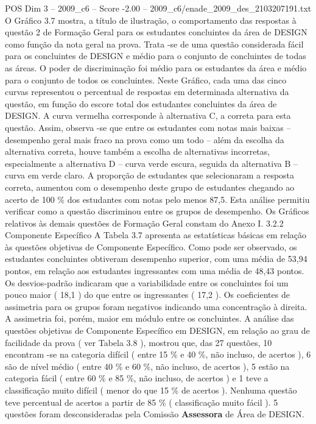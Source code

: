 \begin{textsample}{POS Dim 3 – 2009\_c6 – Score -2.00 – 2009\_c6/enade\_2009\_des\_2103207191.txt}
O Gráfico 3.7 mostra, a título de ilustração, o comportamento das respostas à questão 2 de Formação Geral para os estudantes concluintes da área de DESIGN como função da nota geral na prova.
Trata -se de uma questão considerada fácil para os concluintes de DESIGN e médio para o conjunto de concluintes de todas as áreas.
O poder de discriminação foi médio para os estudantes da área e médio para o conjunto de todos os concluintes.
Neste Gráfico, cada uma das cinco curvas representou o percentual de respostas em determinada alternativa da questão, em função do escore total dos estudantes concluintes da área de DESIGN.
A curva vermelha corresponde à alternativa C, a correta para esta questão.
Assim, observa -se que entre os estudantes com notas mais baixas – desempenho geral mais fraco na prova como um todo – além da escolha da alternativa correta, houve também a escolha de alternativas incorretas, especialmente a alternativa D – curva verde escura, seguida da alternativa B – curva em verde claro.
A proporção de estudantes que selecionaram a resposta correta, aumentou com o desempenho deste grupo de estudantes chegando ao acerto de 100 \% dos estudantes com notas pelo menos 87,5.
Esta análise permitiu verificar como a questão discriminou entre os grupos de desempenho.
Os Gráficos relativos às demais questões de Formação Geral constam do Anexo I. 3.2.2 Componente Específico A Tabela 3.7 apresenta as estatísticas básicas em relação às questões objetivas de Componente Específico.
Como pode ser observado, os estudantes concluintes obtiveram desempenho superior, com uma média de 53,94 pontos, em relação aos estudantes ingressantes com uma média de 48,43 pontos.
Os desvios-padrão indicaram que a variabilidade entre os concluintes foi um pouco maior ( 18,1 ) do que entre os ingressantes ( 17,2 ).
Os coeficientes de assimetria para os grupos foram negativos indicando uma concentração à direita.
A assimetria foi, porém, maior em módulo entre os concluintes.
A análise das questões objetivas de Componente Específico em DESIGN, em relação ao grau de facilidade da prova ( ver Tabela 3.8 ), mostrou que, das 27 questões, 10 encontram -se na categoria difícil ( entre 15 \% e 40 \%, não incluso, de acertos ), 6 são de nível médio ( entre 40 \% e 60 \%, não incluso, de acertos ), 5 estão na categoria fácil ( entre 60 \% e 85 \%, não incluso, de acertos ) e 1 teve a classificação muito difícil ( menor do que 15 \% de acertos ).
Nenhuma questão teve percentual de acertos a partir de 85 \% ( classificação muito fácil ). 5 questões foram desconsideradas pela Comissão \textbf{Assessora} de Área de DESIGN.

\end{textsample}
